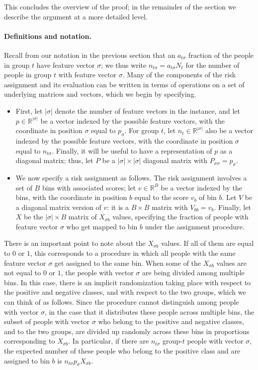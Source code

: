 \documentclass[11pt]{article}
\newcommand{\xhdr}[1]{\vspace{-0.2in} \paragraph*{\bf {#1}.}}
\def\R{\mathbb{R}}
\def\s{|\sigma|}
\begin{document}
This concludes the overview of the proof; in the remainder of the
section we describe the argument at a more detailed level.

\xhdr{Definitions and notation}
Recall from our notation in the previous section that
an $a_{t \sigma}$ fraction of the people in group $t$ have
feature vector $\sigma$; we thus write $n_{t \sigma} = a_{t \sigma} N_t$
for the number of people in group $t$ with feature vector $\sigma$.
Many of the components of the risk assignment and its evaluation
can be written in terms of operations on 
a set of underlying matrices and vectors, which we begin by specifying.

\begin{itemize}
\item 
First, let $\s$ denote the number of feature vectors in the instance,
and let $p \in \R^{\s}$ be a vector indexed by the possible
feature vectors, with the coordinate in position $\sigma$ equal to $p_\sigma$.
For group $t$, 
let $n_t \in \R^{\s}$ also be a vector indexed by the possible
feature vectors, with the coordinate in position $\sigma$ equal 
to $n_{t \sigma}$.
Finally, it will be useful to have a representation of $p$ as a 
diagonal matrix; thus, let $P$ be a $\s \times \s$
diagonal matrix with $P_{\sigma \sigma} = p_{\sigma}$.
\item 
We now specify a risk assignment as follows.
The risk assignment involves a set of $B$ bins with associated scores;
let $v \in \R^B$ be a vector indexed by the bins,
with the coordinate in position $b$ equal to the score $v_b$ of bin $b$.
Let $V$ be a diagonal matrix version of $v$: it is a $B \times B$ matrix
with $V_{bb} = v_b$.
Finally, let $X$ be the $\s \times B$ matrix of $X_{\sigma b}$ values,
specifying the fraction of people with feature vector $\sigma$
who get mapped to bin $b$ under the assignment procedure.
\end{itemize}

There is an important point to note about the $X_{\sigma b}$ values.
If all of them are equal to $0$ or $1$, this corresponds to a procedure
in which all people with the same feature vector $\sigma$ get assigned
to the same bin.
When some of the $X_{\sigma b}$ values are not equal to $0$ or $1$, the
people with vector $\sigma$ are being divided among multiple bins.
In this case, there is an implicit randomization taking place
with respect to the positive and negative classes, and with respect
to the two groups, which we can think of as follows.
Since the procedure cannot distinguish among people with vector $\sigma$,
in the case that it distributes these people across multiple bins, the
subset of people with vector $\sigma$ who belong to the positive and negative
classes, and to the two groups,
are divided up randomly across these bins in proportions corresponding
to $X_{\sigma b}$.
In particular, if there are $n_{t \sigma}$ group-$t$
people with vector $\sigma$,
the expected number of these people who belong to the positive class
and are assigned to bin $b$ is $n_{t \sigma} p_\sigma X_{\sigma b}$.
\end{document}
